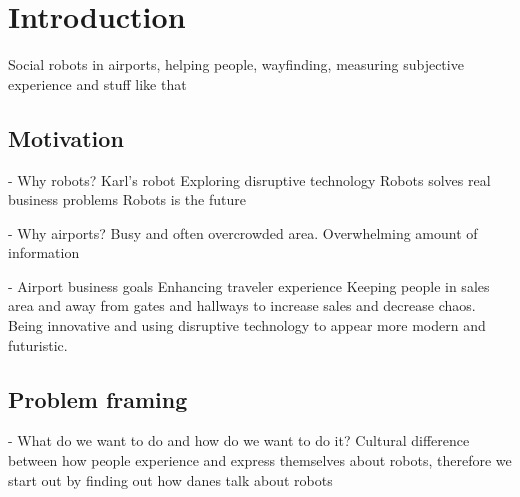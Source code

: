 \section{Introduction}
\label{Introduction}

Social robots in airports, helping people, wayfinding, measuring subjective experience and stuff like that

\subsection{Motivation}
- Why robots?
Karl’s robot
Exploring disruptive technology
Robots solves real business problems
Robots is the future

- Why airports?
Busy and often overcrowded area. Overwhelming amount of information

- Airport business goals
Enhancing traveler experience
Keeping people in sales area and away from gates and hallways to increase sales and decrease chaos.
Being innovative and using disruptive technology to appear more modern and futuristic.

\subsection{Problem framing}
- What do we want to do and how do we want to do it?
Cultural difference between how people experience and express themselves about robots, therefore we start out by finding out how danes talk about robots
